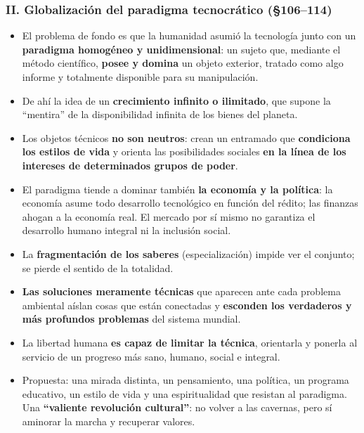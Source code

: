 \documentclass[10pt,a4paper]{article}
\begin{document}
\subsubsection{II. Globalización del paradigma tecnocrático (\S{}106--114)}
\begin{itemize}
\item El problema de fondo es que la humanidad asumió la tecnología junto con un \textbf{paradigma homogéneo y unidimensional}: un sujeto que, mediante el método científico, \textbf{posee y domina} un objeto exterior, tratado como algo informe y totalmente disponible para su manipulación.
\item De ahí la idea de un \textbf{crecimiento infinito o ilimitado}, que supone la ``mentira'' de la disponibilidad infinita de los bienes del planeta.
\item Los objetos técnicos \textbf{no son neutros}: crean un entramado que \textbf{condiciona los estilos de vida} y orienta las posibilidades sociales \textbf{en la línea de los intereses de determinados grupos de poder}.
\item El paradigma tiende a dominar también \textbf{la economía y la política}: la economía asume todo desarrollo tecnológico en función del rédito; las finanzas ahogan a la economía real. El mercado por sí mismo no garantiza el desarrollo humano integral ni la inclusión social.
\item La \textbf{fragmentación de los saberes} (especialización) impide ver el conjunto; se pierde el sentido de la totalidad.
\item \textbf{Las soluciones meramente técnicas} que aparecen ante cada problema ambiental aíslan cosas que están conectadas y \textbf{esconden los verdaderos y más profundos problemas} del sistema mundial.
\item La libertad humana \textbf{es capaz de limitar la técnica}, orientarla y ponerla al servicio de un progreso más sano, humano, social e integral.
\item Propuesta: una mirada distinta, un pensamiento, una política, un programa educativo, un estilo de vida y una espiritualidad que resistan al paradigma. Una \textbf{``valiente revolución cultural''}: no volver a las cavernas, pero sí aminorar la marcha y recuperar valores.
\end{itemize}
\end{document}
